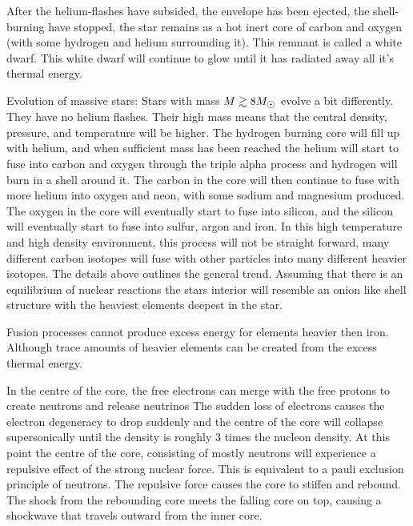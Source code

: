After the helium-flashes have subsided, the envelope has been ejected, the shell-burning have stopped, the star remains as a hot inert core of carbon and oxygen (with some hydrogen and helium surrounding it). This remnant is called a white dwarf.
This white dwarf will continue to glow until it has radiated away all it's thermal energy.

Evolution of massive stars:
Stars with mass $M \gtrsim 8 \msol$ evolve a bit differently. They have no helium flashes.
Their high mass means that the central density, pressure, and temperature will be higher.
The hydrogen burning core will fill up with helium, and when sufficient mass has been reached the helium will start to fuse into carbon and oxygen through the triple alpha process and hydrogen will burn in a shell around it.
The carbon in the core will then continue to fuse with more helium into oxygen and neon, with some sodium and magnesium produced.
The oxygen in the core will eventually start to fuse into silicon, and the silicon will eventually start to fuse into sulfur, argon and iron.
In this high temperature and high density environment, this process will not be straight forward, many different carbon isotopes will fuse with other particles into many different heavier isotopes. The details above outlines the general trend.
Assuming that there is an equilibrium of nuclear reactions the stars interior will resemble an onion like shell structure with the heaviest elements deepest in the star.

Fusion processes cannot produce excess energy for elements heavier then iron. Although trace amounts of heavier elements can be created from the excess thermal energy.
\iffalse
#photo disintegration free protons and electrons
Due to the high temperature and density along with the presence of heavy isotopes, can cause protons and electrons to be ejected from their isotopes.
\fi
In the centre of the core, the free electrons can merge with the free protons to create neutrons and release neutrinos
The sudden loss of electrons causes the electron degeneracy to drop suddenly and the centre of the core will collapse supersonically until the density is roughly 3 times the nucleon density. At this point the centre of the core, consisting of mostly neutrons will experience a repulsive effect of the strong nuclear force. This is equivalent to a pauli exclusion principle of neutrons.
The repulsive force causes the core to stiffen and rebound. The shock from the rebounding core meets the falling core on top, causing a shockwave that travels outward from the inner core.

